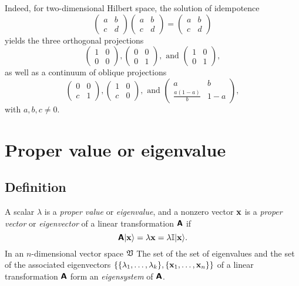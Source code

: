 {%
Indeed, for two-dimensional Hilbert space, the solution
of idempotence
$$
\begin{pmatrix}
a&b \\
c&d
\end{pmatrix}
\begin{pmatrix}
a&b \\
c&d
\end{pmatrix}
=
\begin{pmatrix}
a&b \\
c&d
\end{pmatrix}
$$
yields the three orthogonal projections
$$
\begin{pmatrix}
1&0 \\
0&0
\end{pmatrix},
\begin{pmatrix}
0&0 \\
0&1
\end{pmatrix},\text{ and }
\begin{pmatrix}
1&0 \\
0&1
\end{pmatrix},
$$
as well as a continuum of oblique projections
$$
\begin{pmatrix}
0&0 \\
c&1
\end{pmatrix},
\begin{pmatrix}
1&0 \\
c&0
\end{pmatrix},\text{ and }
\begin{pmatrix}
a&b \\
\frac{a(1-a)}{b}&1-a
\end{pmatrix},
$$
with $a,b,c \neq 0$.
}


\section{Proper value or eigenvalue}

\subsection{Definition}

A scalar $\lambda$ is a {\em proper value} or {\em eigenvalue},
and a nonzero vector ${\bf x}$ is a {\em proper vector} or {\em eigenvector}
of a linear transformation $\textsf{\textbf{A}}$
if
\begin{equation}
\textsf{\textbf{A}}\vert {\bf x}  \rangle =   \lambda {\bf x} =   \lambda {\Bbb I} \vert {\bf x}  \rangle .
\end{equation}
In an $n$-dimensional
vector space $\frak V$
The set of the set of eigenvalues and the set of the associated eigenvectors
$\{\{\lambda_1,\ldots ,\lambda_k\},\{{\bf x}_1,\ldots ,{\bf x}_n\}\}$
of a linear transformation $\textsf{\textbf{A}}$ form an {\em eigensystem} of $\textsf{\textbf{A}}$.

